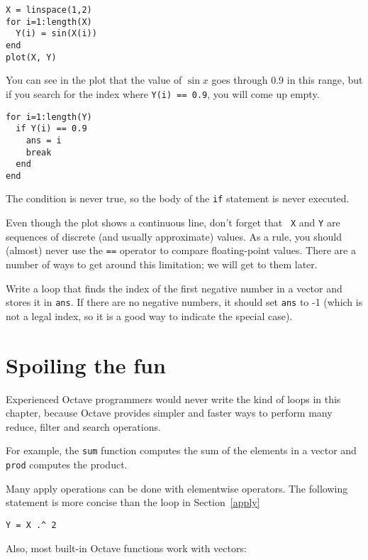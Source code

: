 \begin{verbatim}
X = linspace(1,2)
for i=1:length(X)
  Y(i) = sin(X(i))
end
plot(X, Y)
\end{verbatim}

You can see in the plot that the value of $\sin x$ goes through
0.9 in this range, but if you search for the index where
{\tt Y(i) == 0.9}, you will come up empty.

\begin{verbatim}
for i=1:length(Y)
  if Y(i) == 0.9
    ans = i
    break
  end
end
\end{verbatim}

The condition is never true, so the body of the {\tt if} statement
is never executed.

Even though the plot shows a continuous line, don't forget that {\tt
X} and {\tt Y} are sequences of discrete (and usually approximate)
values. As a rule, you should (almost) never use the {\tt ==}
operator to compare floating-point values. There are a number of ways
to get around this limitation; we will get to them later.

\begin{ex}
Write a loop that finds the index of the first
negative number in a vector and stores it in {\tt ans}. If there are
no negative numbers, it should set {\tt ans} to -1 (which is not
a legal index, so it is a good way to indicate the special case).
\end{ex}



\section{Spoiling the fun}

Experienced Octave programmers would never write the kind of loops
in this chapter, because Octave provides simpler and faster ways to
perform many reduce, filter and search operations.

For example, the {\tt sum} function computes the sum of the elements
in a vector and {\tt prod} computes the product.

Many apply operations can be done with elementwise operators. The
following statement is more concise than the loop in
Section~\ref{apply}

\begin{verbatim}
Y = X .^ 2
\end{verbatim}

Also, most built-in Octave functions work with vectors:

